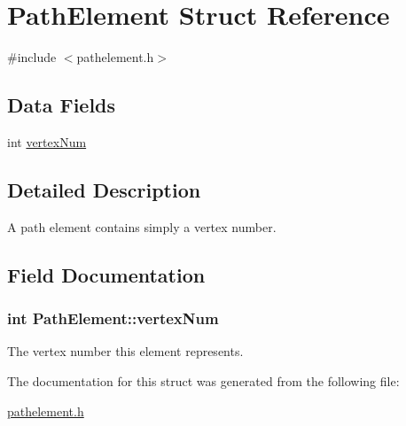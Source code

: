 \hypertarget{structPathElement}{}\section{Path\+Element Struct Reference}
\label{structPathElement}


{\ttfamily \#include $<$pathelement.\+h$>$}

\subsection*{Data Fields}
\begin{DoxyCompactItemize}
\item 
int \hyperlink{structPathElement_a1f2bbaf04337046497c6ac63d96062a7}{vertex\+Num}
\end{DoxyCompactItemize}


\subsection{Detailed Description}
A path element contains simply a vertex number. 

\subsection{Field Documentation}
\subsubsection[{\texorpdfstring{vertex\+Num}{vertexNum}}]{\setlength{\rightskip}{0pt plus 5cm}int Path\+Element\+::vertex\+Num}\hypertarget{structPathElement_a1f2bbaf04337046497c6ac63d96062a7}{}\label{structPathElement_a1f2bbaf04337046497c6ac63d96062a7}
The vertex number this element represents. 

The documentation for this struct was generated from the following file\+:\begin{DoxyCompactItemize}
\item 
\hyperlink{pathelement_8h}{pathelement.\+h}\end{DoxyCompactItemize}
